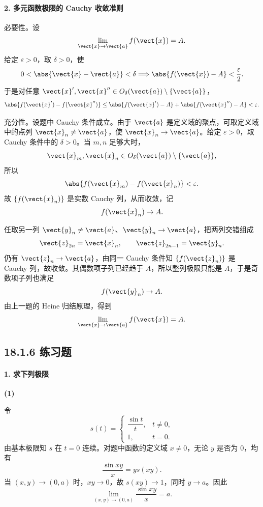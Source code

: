 \paragraph{2. 多元函数极限的 Cauchy 收敛准则}
\begin{xsolution}
必要性。设
\[
  \lim_{\vect{x}\to\vect{a}}f(\vect{x})=A.
\]
给定 $\varepsilon>0$，取 $\delta>0$，使
\[
  0<\abs{\vect{x}-\vect{a}}<\delta
  \Longrightarrow
  \abs{f(\vect{x})-A}<\frac\varepsilon2.
\]
于是对任意 $\vect{x}',\vect{x}''\in O_\delta(\vect{a})\setminus\{\vect{a}\}$，
\[
  \abs{f(\vect{x}')-f(\vect{x}'')}
  \le
  \abs{f(\vect{x}')-A}+\abs{f(\vect{x}'')-A}
  <\varepsilon.
\]

充分性。设题中 Cauchy 条件成立。由于 $\vect{a}$ 是定义域的聚点，可取定义域中的点列 $\vect{x}_n\ne\vect{a}$，使 $\vect{x}_n\to\vect{a}$。给定 $\varepsilon>0$，取 Cauchy 条件中的 $\delta>0$。当 $m,n$ 足够大时，
\[
  \vect{x}_m,\vect{x}_n\in O_\delta(\vect{a})\setminus\{\vect{a}\},
\]
所以
\[
  \abs{f(\vect{x}_m)-f(\vect{x}_n)}<\varepsilon.
\]
故 $\{f(\vect{x}_n)\}$ 是实数 Cauchy 列，从而收敛，记
\[
  f(\vect{x}_n)\to A.
\]

任取另一列 $\vect{y}_n\ne\vect{a}$、$\vect{y}_n\to\vect{a}$，把两列交错组成
\[
  \vect{z}_{2n}=\vect{x}_n,
  \qquad
  \vect{z}_{2n-1}=\vect{y}_n.
\]
仍有 $\vect{z}_n\to\vect{a}$，由同一 Cauchy 条件知 $\{f(\vect{z}_n)\}$ 是 Cauchy 列，故收敛。其偶数项子列已经趋于 $A$，所以整列极限只能是 $A$，于是奇数项子列也满足
\[
  f(\vect{y}_n)\to A.
\]
由上一题的 Heine 归结原理，得到
\[
  \lim_{\vect{x}\to\vect{a}}f(\vect{x})=A.
\]
\end{xsolution}

\subsection*{18.1.6 练习题}

\paragraph{1. 求下列极限}

\textbf{(1)}
\begin{xsolution}
令
\[
  s(t)=
  \begin{cases}
    \dfrac{\sin t}{t}, & t\ne0,\\[4pt]
    1, & t=0.
  \end{cases}
\]
由基本极限知 $s$ 在 $t=0$ 连续。对题中函数的定义域 $x\ne0$，无论 $y$ 是否为 $0$，均有
\[
  \frac{\sin xy}{x}=y s(xy).
\]
当 $(x,y)\to(0,a)$ 时，$xy\to0$，故 $s(xy)\to1$，同时 $y\to a$。因此
\[
  \boxed{\displaystyle
  \lim_{(x,y)\to(0,a)}\frac{\sin xy}{x}=a}.
\]
\end{xsolution}

